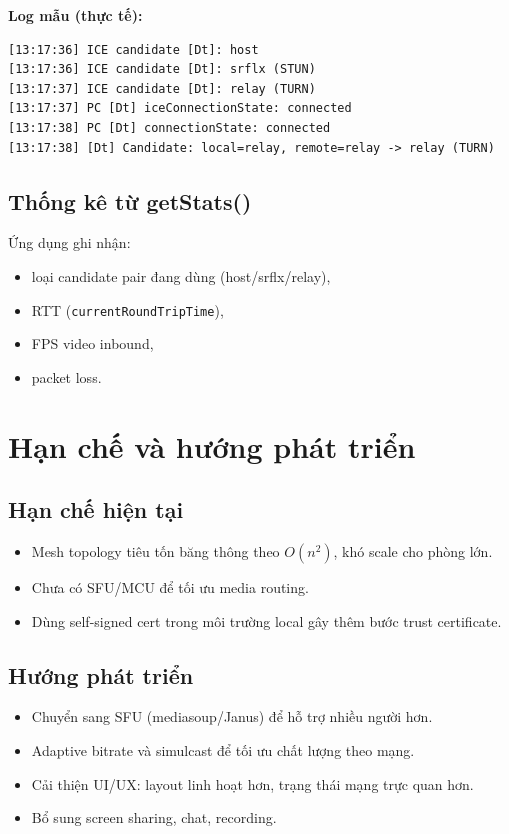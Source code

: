 \documentclass[12pt,a4paper]{article}
\begin{document}
\textbf{Log mẫu (thực tế):}
\begin{lstlisting}
[13:17:36] ICE candidate [Dt]: host
[13:17:36] ICE candidate [Dt]: srflx (STUN)
[13:17:37] ICE candidate [Dt]: relay (TURN)
[13:17:37] PC [Dt] iceConnectionState: connected
[13:17:38] PC [Dt] connectionState: connected
[13:17:38] [Dt] Candidate: local=relay, remote=relay -> relay (TURN)
\end{lstlisting}

\subsection{Thống kê từ getStats()}
Ứng dụng ghi nhận:
\begin{itemize}[leftmargin=1.5em]
  \item loại candidate pair đang dùng (host/srflx/relay),
  \item RTT (\texttt{currentRoundTripTime}),
  \item FPS video inbound,
  \item packet loss.
\end{itemize}

\section{Hạn chế và hướng phát triển}

\subsection{Hạn chế hiện tại}
\begin{itemize}[leftmargin=1.5em]
  \item Mesh topology tiêu tốn băng thông theo $O(n^2)$, khó scale cho phòng lớn.
  \item Chưa có SFU/MCU để tối ưu media routing.
  \item Dùng self-signed cert trong môi trường local gây thêm bước trust certificate.
\end{itemize}

\subsection{Hướng phát triển}
\begin{itemize}[leftmargin=1.5em]
  \item Chuyển sang SFU (mediasoup/Janus) để hỗ trợ nhiều người hơn.
  \item Adaptive bitrate và simulcast để tối ưu chất lượng theo mạng.
  \item Cải thiện UI/UX: layout linh hoạt hơn, trạng thái mạng trực quan hơn.
  \item Bổ sung screen sharing, chat, recording.
\end{itemize}
\end{document}
